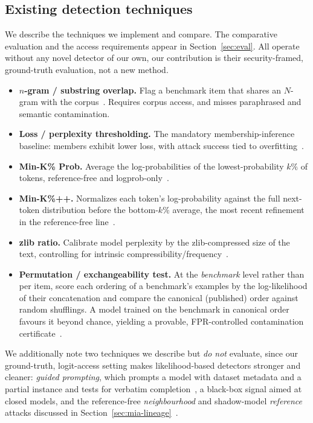 \subsection{Existing detection techniques}
We describe the techniques we implement and compare. The comparative evaluation and
the access requirements appear in Section~\ref{sec:eval}. All operate without any novel
detector of our own, our contribution is their security-framed, ground-truth
evaluation, not a new method.
\begin{itemize}
 \item \textbf{$n$-gram / substring overlap.} Flag a benchmark item that shares an
 $N$-gram with the corpus~\citep{brown2020gpt3}. Requires corpus access, and misses
 paraphrased and semantic contamination.
 \item \textbf{Loss / perplexity thresholding.} The mandatory membership-inference
 baseline: members exhibit lower loss, with attack success tied to
 overfitting~\citep{yeom2018privacy}.
 \item \textbf{Min-K\% Prob.} Average the log-probabilities of the lowest-probability
 $k\%$ of tokens, reference-free and logprob-only~\citep{shi2024detecting}.
 \item \textbf{Min-K\%++.} Normalizes each token's log-probability against the full
 next-token distribution before the bottom-$k\%$ average, the most recent refinement in
 the reference-free line~\citep{zhang2025minkpp}.
 \item \textbf{zlib ratio.} Calibrate model perplexity by the zlib-compressed
 size of the text, controlling for intrinsic compressibility/frequency~\citep{carlini2021extracting}.
 \item \textbf{Permutation / exchangeability test.} At the \emph{benchmark} level rather
 than per item, score each ordering of a benchmark's examples by the log-likelihood of
 their concatenation and compare the canonical (published) order against random
 shufflings. A model trained on the benchmark in canonical order favours it beyond
 chance, yielding a provable, FPR-controlled contamination
 certificate~\citep{oren2024proving}.
\end{itemize}
We additionally note two techniques we describe but \emph{do not} evaluate, since our
ground-truth, logit-access setting makes likelihood-based detectors stronger and cleaner:
\emph{guided prompting}, which prompts a model with dataset metadata and a partial
instance and tests for verbatim completion~\citep{golchin2024timetravel}, a black-box
signal aimed at closed models, and the reference-free \emph{neighbourhood} and
shadow-model \emph{reference} attacks discussed in
Section~\ref{sec:mia-lineage}~\citep{mattern2023neighbourhood,shokri2017membership}.

